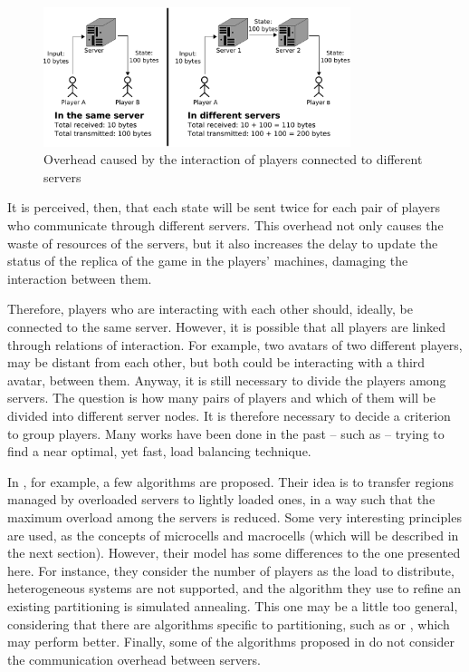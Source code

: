 \begin{figure}
 \centering
 \includegraphics[width=0.8\textwidth]{images/overheadgeneration}
 \caption{Overhead caused by the interaction of players connected to different servers}
 \label{fig:overheadgeneration}
\end{figure}

It is perceived, then, that each state will be sent twice for each pair of players who communicate through different servers. This overhead not only causes the waste of resources of the servers, but it also increases the delay to update the status of the replica of the game in the players' machines, damaging the interaction between them.
	
Therefore, players who are interacting with each other should, ideally, be connected to the same server. However, it is possible that all players are linked through relations of interaction. For example, two avatars of two different players, may be distant from each other, but both could be interacting with a third avatar, between them. Anyway, it is still necessary to divide the players among servers. The question is how many pairs of players and which of them will be divided into different server nodes. It is therefore necessary to decide a criterion to group players. Many works have been done in the past -- such as \cite{devleeschauwer2005dma,lu2006lbm,chen2005lad,duong2003dls,ahmed2008mol} --  trying to find a near optimal, yet fast, load balancing technique.

In \cite{devleeschauwer2005dma}, for example, a few algorithms are proposed. Their idea is to transfer regions managed by overloaded servers to  lightly loaded ones, in a way such that the maximum overload among the servers is reduced. Some very interesting principles are used, as the concepts of microcells and macrocells (which will be described in the next section). However, their model has some differences to the one presented here. For instance, they consider the number of players as the load to distribute, heterogeneous systems are not supported, and the algorithm they use to refine an existing partitioning is simulated annealing. This one may be a little too general, considering that there are algorithms specific to partitioning, such as \cite{kernighan1970ehp} or \cite{fiduccia1982lth}, which may perform better. Finally, some of the algorithms proposed in \cite{devleeschauwer2005dma} do not consider the communication overhead between servers.


